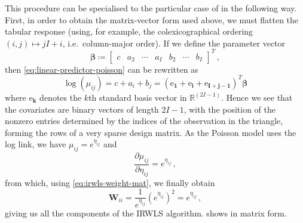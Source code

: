 \documentclass[a4paper]{book}
\begin{document}
This procedure can be specialised to the particular case of  in the following way. First, in order to obtain the matrix-vector form used above, we must flatten the tabular response (using, for example, the colexicographical ordering $(i, j) \mapsto j I + i$, i.e.\ column-major order). If we define the parameter vector
\begin{equation}
  \bm{\beta} \coloneqq \begin{bmatrix} c & a_2 & \cdots & a_I & b_2 & \cdots & b_I \end{bmatrix}^T \,,
\end{equation}
then \cref{eq:linear-predictor-poisson} can be rewritten as
\begin{equation} \label{eq:poisson-covariates}
  \log(\mu_{ij}) = c + a_i + b_j = (\bm{\mathrm{e}_1} + \bm{\mathrm{e}_i} + \bm{\mathrm{e}_{I + j - 1}})^T \bm{\beta}
\end{equation}
where $\bm{\mathrm{e}_k}$ denotes the $k$th standard basis vector in $\mathbb{R}^{(2I - 1)}$. Hence we see that the covariates are binary vectors of length $2I - 1$, with the position of the nonzero entries determined by the indices of the observation in the triangle, forming the rows of a very sparse design matrix. As the Poisson model uses the log link, we have $\mu_{ij} = e^{\eta_{ij}}$ and
\begin{equation}
  \frac{\partial \mu_{ij}}{\partial \eta_{ij}} = e^{\eta_{ij}} \,,
\end{equation}
from which, using \cref{eq:irwls-weight-mat}, we finally obtain
\begin{equation}
  \mathbf{W}_{ii} = \frac{1}{e^{\eta_{ij}}} (e^{\eta_{ij}})^2 = e^{\eta_{ij}} \,,
\end{equation}
giving us all the components of the IRWLS algorithm.  shows in matrix form.
\end{document}
